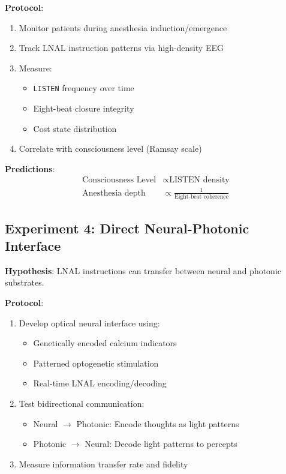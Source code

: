 \documentclass[12pt,a4paper]{article}
\newcommand{\opcmd}[1]{\texttt{#1}}
\begin{document}
\textbf{Protocol}:
\begin{enumerate}
\item Monitor patients during anesthesia induction/emergence
\item Track LNAL instruction patterns via high-density EEG
\item Measure:
   \begin{itemize}
   \item \opcmd{LISTEN} frequency over time
   \item Eight-beat closure integrity
   \item Cost state distribution
   \end{itemize}
\item Correlate with consciousness level (Ramsay scale)
\end{enumerate}

\textbf{Predictions}:
\begin{align}
\text{Consciousness Level} &\propto \text{LISTEN density} \\
\text{Anesthesia depth} &\propto \frac{1}{\text{Eight-beat coherence}}
\end{align}

\subsection{Experiment 4: Direct Neural-Photonic Interface}

\textbf{Hypothesis}: LNAL instructions can transfer between neural and photonic substrates.

\textbf{Protocol}:
\begin{enumerate}
\item Develop optical neural interface using:
   \begin{itemize}
   \item Genetically encoded calcium indicators
   \item Patterned optogenetic stimulation
   \item Real-time LNAL encoding/decoding
   \end{itemize}
\item Test bidirectional communication:
   \begin{itemize}
   \item Neural $\to$ Photonic: Encode thoughts as light patterns
   \item Photonic $\to$ Neural: Decode light patterns to percepts
   \end{itemize}
\item Measure information transfer rate and fidelity
\end{enumerate}
\end{document}
